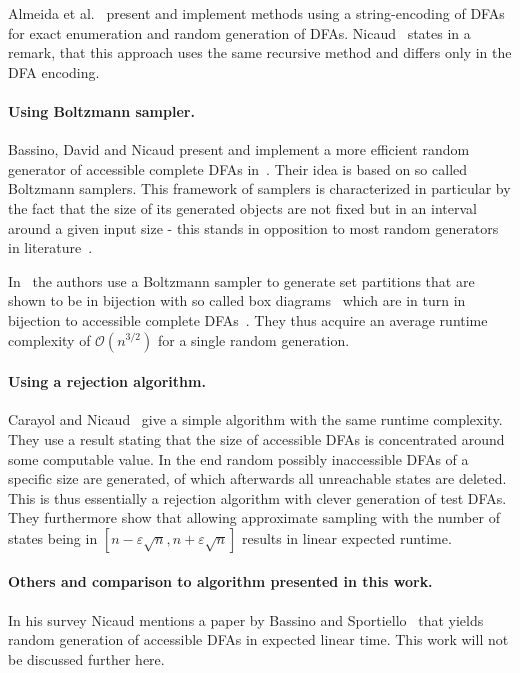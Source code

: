 Almeida et al.~\cite{AAA09, AMR09, RMA05} present and implement methods using a string-encoding of DFAs for exact enumeration and random generation of DFAs. Nicaud~\cite[p. 11]{Nic14} states in a remark, that this approach uses the same recursive method and differs only in the DFA encoding.

\paragraph*{Using Boltzmann sampler.}

Bassino, David and Nicaud present and implement a more efficient random generator of accessible complete DFAs in~\cite{BDN07, BN07}. Their idea is based on so called Boltzmann samplers. This framework of samplers is characterized in particular by the fact that the size of its generated objects are not fixed but in an interval around a given input size - this stands in opposition to most random generators in literature~\cite[p. 2]{DFL04}.

In~\cite{BN07} the authors use a Boltzmann sampler to generate set partitions that are shown to be in bijection with so called box diagrams~\cite[p. 8]{BN07} which are in turn in bijection to accessible complete DFAs~\cite[p. 4]{BN07}. They thus acquire an average runtime complexity of $\mathcal{O}(n^{3/2})$ for a single random generation.

\paragraph*{Using a rejection algorithm.}

Carayol and Nicaud~\cite{CN12} give a simple algorithm with the same runtime complexity. They use a result stating that the size of accessible DFAs is concentrated around some computable value. In the end random possibly inaccessible DFAs of a specific size are generated, of which afterwards all unreachable states are deleted. This is thus essentially a rejection algorithm with clever generation of test DFAs. They furthermore show that allowing approximate sampling with the number of states being in $[n-\varepsilon\sqrt{n}, n+\varepsilon\sqrt{n}]$ results in linear expected runtime.

\paragraph*{Others and comparison to algorithm presented in this work.}

In his survey Nicaud mentions a paper by Bassino and Sportiello~\cite{BS13} that yields random generation of accessible DFAs in expected linear time. This work will not be discussed further here.

